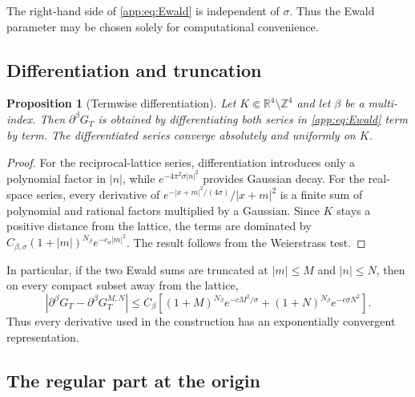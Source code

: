 \documentclass[11pt,a4paper,twoside]{article}
\numberwithin{equation}{section}
\newtheorem{proposition}[theorem]{Proposition}
\theoremstyle{definition}
\theoremstyle{remark}
\begin{document}
The right-hand side of \eqref{app:eq:Ewald} is independent of
\(\sigma\). Thus the Ewald parameter may be chosen solely for
computational convenience.

\subsection{Differentiation and truncation}

\begin{proposition}[Termwise differentiation]
\label{app:prop:Ewald-derivatives}
Let \(K\Subset\mathbb R^4\setminus\mathbb Z^4\) and let
\(\beta\) be a multi-index. Then \(\partial^\beta G_T\) is obtained
by differentiating both series in \eqref{app:eq:Ewald} term by term.
The differentiated series converge absolutely and uniformly on \(K\).
\end{proposition}

\begin{proof}
For the reciprocal-lattice series, differentiation introduces only a
polynomial factor in \(|n|\), while \(e^{-4\pi^2\sigma|n|^2}\)
provides Gaussian decay. For the real-space series, every derivative
of \(e^{-|x+m|^2/(4\sigma)}/|x+m|^2\) is a finite sum of polynomial
and rational factors multiplied by a Gaussian. Since \(K\) stays a
positive distance from the lattice, the terms are dominated by
\(C_{\beta,\sigma}(1+|m|)^{N_\beta}e^{-c_\sigma|m|^2}\).
The result follows from the Weierstrass test.
\end{proof}

In particular, if the two Ewald sums are truncated at \(|m|\le M\)
and \(|n|\le N\), then on every compact subset away from the lattice,
\[
\left|\partial^\beta G_T-\partial^\beta G_T^{M,N}\right|
\le C_\beta\left[(1+M)^{N_\beta}e^{-cM^2/\sigma}
+(1+N)^{N_\beta}e^{-c\sigma N^2}\right].
\]
Thus every derivative used in the construction has an exponentially
convergent representation.

\subsection{The regular part at the origin}
\end{document}
